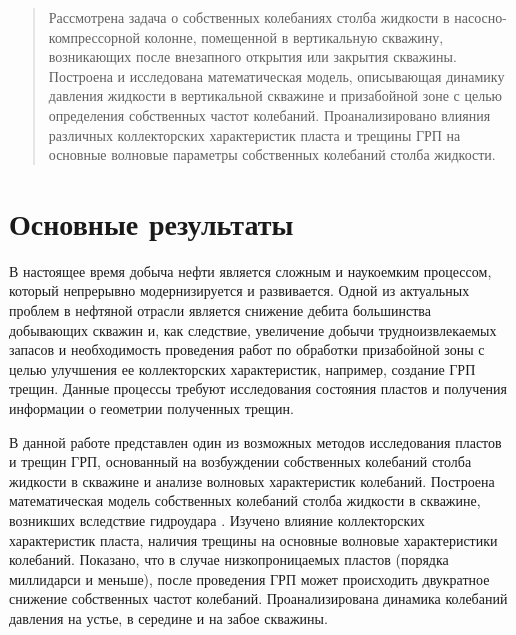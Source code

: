 \maketitle

\begin{abstract}
 Рассмотрена задача о собственных колебаниях столба жидкости в насосно-компрессорной колонне, помещенной в вертикальную скважину, возникающих после внезапного открытия или закрытия скважины. Построена и исследована математическая модель, описывающая динамику давления жидкости в вертикальной скважине и призабойной зоне с целью определения собственных частот колебаний. Проанализировано влияния различных коллекторских характеристик пласта и трещины ГРП на основные волновые параметры собственных колебаний столба жидкости.  
\end{abstract}

\section{Основные результаты} %

В настоящее время добыча нефти является сложным и наукоемким процессом, который непрерывно модернизируется и развивается. Одной из актуальных проблем в нефтяной отрасли является снижение дебита большинства добывающих скважин и, как следствие, увеличение добычи трудноизвлекаемых запасов и необходимость проведения работ по обработки призабойной зоны с целью улучшения ее коллекторских характеристик, например, создание ГРП трещин. Данные процессы требуют исследования состояния пластов и получения информации о геометрии полученных трещин. 

В данной работе представлен один из возможных методов исследования пластов и трещин ГРП, основанный на возбуждении собственных колебаний столба жидкости в скважине и анализе волновых характеристик колебаний. Построена математическая модель собственных колебаний столба жидкости в скважине, возникших вследствие гидроудара  \cite{1,2}. Изучено влияние коллекторских характеристик пласта, наличия трещины на основные волновые характеристики колебаний. Показано, что в случае низкопроницаемых пластов (порядка миллидарси и меньше), после проведения ГРП может происходить двукратное снижение собственных частот колебаний. Проанализирована динамика колебаний давления на устье, в середине и на забое скважины.  


